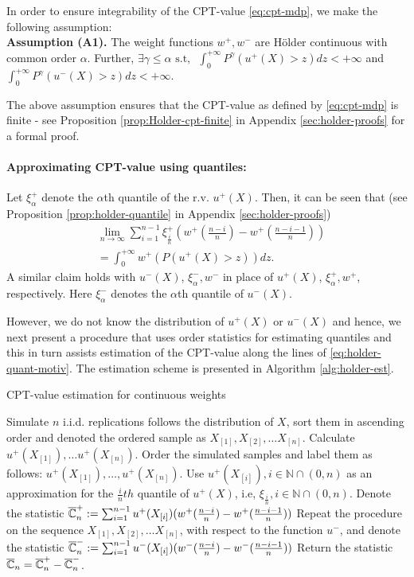 In order to ensure integrability of the CPT-value \eqref{eq:cpt-mdp}, we make the following assumption:\\[1ex]
\textbf{Assumption (A1).}  
The weight functions $w^+, w^-$ are H\"{o}lder continuous with common order $\alpha$. Further,
$\exists \gamma \le \alpha \text{   s.t,  }$ 
$\int_0^{+\infty} P^{\gamma} (u^+(X)>z) dz < +\infty$ and $\int_0^{+\infty} P^{\gamma} (u^-(X)>z) dz < +\infty.$

The above assumption ensures that the CPT-value as defined by \eqref{eq:cpt-mdp} is finite - see Proposition \ref{prop:Holder-cpt-finite} in 
Appendix \ref{sec:holder-proofs} for a formal proof.


\paragraph{Approximating CPT-value using quantiles:}
Let $\xi^+_{\alpha}$ denote the $\alpha$th quantile of the r.v. $u^+(X)$. Then, it can be seen that (see Proposition \ref{prop:holder-quantile} in Appendix \ref{sec:holder-proofs})
\begin{align}
&\lim_{n \rightarrow \infty} \sum_{i=1}^{n-1} \xi^+_{\frac{i}{n}} \left(w^+\left(\frac{n-i}{n}\right)- w^+\left(\frac{n-i-1}{n}\right) \right) \nonumber\\
&= \int_0^{+\infty} w^+(P(u^+(X)>z)) dz.\label{eq:holder-quant-motiv}
\end{align}
A similar claim holds with $u^-(X)$, $\xi^-_{\alpha}, w^-$ in place of  $u^+(X)$, $\xi^+_{\alpha}, w^+$, respectively. Here $\xi^-_{\alpha}$ denotes the 
$\alpha$th quantile of $u^-(X)$.

However, we do not know the distribution of $u^+(X)$ or $u^-(X)$ and hence, we next present a procedure that uses order statistics for estimating quantiles and this in turn assists estimation of the CPT-value along the lines of \eqref{eq:holder-quant-motiv}. The estimation scheme is presented in Algorithm \ref{alg:holder-est}.

\begin{algorithm}
\caption{CPT-value estimation for \holder continuous weights}
\label{alg:holder-est}
\begin{algorithmic}[1]
\State Simulate $n$ i.i.d. replications follows the distribution of $X$, sort them in ascending order and denoted the ordered sample as 
$X_{[1]}, X_{[2]}, \ldots X_{[n]}$.
\State Calculate $u^+(X_{[1]}),\ldots u^+(X_{[n]}).$
\State Order the simulated samples and label them as follows: 
$u^+(X_{[1]}),\ldots,u^+(X_{[n]})$.
\State Use $u^+(X_{[i]}), i\in \mathbb{N}\cap (0,n)$ as an approximation for the $\frac{i}{n} th$ quantile of $u^+(X)$, i.e, $\xi_{\frac{i}{n}}, i\in \mathbb{N}\cap (0,n)$.
\State Denote the statistic 
$\overline {\mathbb{C}}_n^+:=\sum_{i=1}^{n-1} u^+(X_{[i]}) (w^+(\frac{n-i}{n})- w^+(\frac{n-i-1}{n}) )$
\State Repeat the procedure on the sequence $X_{[1]}, X_{[2]}, \ldots X_{[n]}$, with respect to the function $u^-$, 
and denote the statistic $\overline {\mathbb{C}}_n^-:=\sum_{i=1}^{n-1} u^-(X_{[i]}) (w^-(\frac{n-i}{n})- w^-(\frac{n-i-1}{n}) ) $
\State Return the statistic $\overline {\mathbb{C}}_n =\overline {\mathbb{C}}_n^+ - \overline {\mathbb{C}}_n^-$.
\end{algorithmic}
\end{algorithm}

